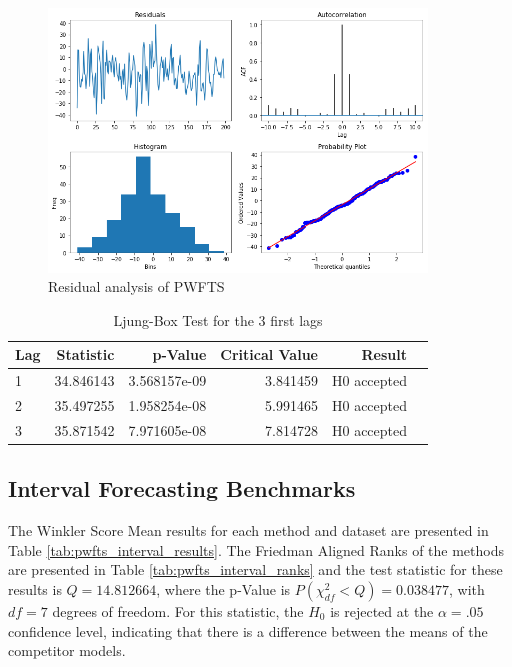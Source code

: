 \begin{figure}[htb]
    \centering
    \includegraphics[width=\textwidth,height=7cm]{figures/pwfts_residual.png}
    \caption{Residual analysis of PWFTS}
    \label{fig:pwfts_residual}
\end{figure}

\begin{table}[htb]
    \centering
\begin{tabular}{lrrrrl}
\toprule
Lag &  Statistic &       p-Value &  Critical Value &       Result \\
\midrule
1 &  34.846143 &  3.568157e-09 &        3.841459 &  H0 accepted \\
2 &  35.497255 &  1.958254e-08 &        5.991465 &  H0 accepted \\
3 &  35.871542 &  7.971605e-08 &        7.814728 &  H0 accepted \\
\bottomrule
\end{tabular}
    \caption{Ljung-Box Test for the 3 first lags}
    \label{tab:pwfts_residual}
\end{table}

\subsection{Interval Forecasting Benchmarks}
\label{sec:pwfts_experiments_interval}

The Winkler Score Mean results for each method and dataset are presented in Table \ref{tab:pwfts_interval_results}. The Friedman Aligned Ranks of the methods are presented in Table \ref{tab:pwfts_interval_ranks} and the test statistic for these results is $Q = 14.812664$, where the p-Value is $P(\chi^2_{df} < Q) = 0.038477$, with $df=7$ degrees of freedom. For this statistic, the $H_0$ is rejected at the $\alpha=.05$ confidence level, indicating that there is a difference between the means of the competitor models.

